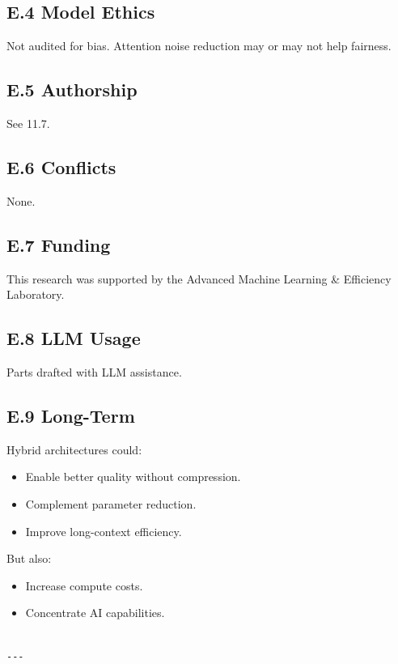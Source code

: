 \subsection{E.4 Model Ethics}

Not audited for bias. Attention noise reduction may or may not help fairness.

\subsection{E.5 Authorship}

See  11.7.

\subsection{E.6 Conflicts}

None.

\subsection{E.7 Funding}

This research was supported by the Advanced Machine Learning & Efficiency Laboratory.

\subsection{E.8 LLM Usage}

Parts drafted with LLM assistance.

\subsection{E.9 Long-Term}

Hybrid architectures could:
\begin{itemize}
\item Enable better quality without compression.
\item Complement parameter reduction.
\item Improve long-context efficiency.

\end{itemize}
But also:
\begin{itemize}
\item Increase compute costs.
\item Concentrate AI capabilities.
\end{itemize}
\begin{lstlisting}

---
\end{lstlisting}